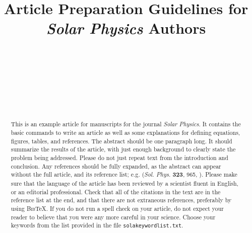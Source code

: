 \documentclass[namedreferences,hyperref,optionalrh]{spr-sola}
\newcommand{\BibTeX}{\textsc{Bib}\TeX}
\newcommand{\solphys}{{\it Sol. Phys.}}
\begin{document}
\begin{frontmatter}
\title{Article Preparation Guidelines for {\it Solar Physics} Authors}

\author[addressref={aff1,aff2,aff3},email={e-mail.a@mail.com}]{~}
\author[addressref=aff1,email={e-mail.b@mail.com}]{~}
\author[addressref=aff2,corref,email={e-mail.c@mail.com}]{~}
\author[addressref=aff3]{~}
\address[id=aff1]{First very very very very very very very very very
 very very very very very very very very very very very very very very very very very very long affiliation and address}
\address[id=aff2]{Institution, City, State, Country}
\address[id=aff3]{Third affiliation and address}


\begin{abstract}
This is an example article for manuscripts for the journal {\it Solar 
Physics}. It contains the basic commands to write an article as well 
as some explanations for defining equations, figures, tables,
and references.    
The abstract should be one paragraph long.  It should summarize
the results of the article, with just enough background to clearly state the
problem being addressed.
Please do not just repeat text from the introduction and conclusion.
Any references should be fully expanded, as the abstract can appear 
without the full article, and its reference list; 
e.g. \citeauthor{Dupont07} (\solphys{} \textbf{323}, 965, 
\citeyear{Dupont07}).
Please make sure that the language of the article has been reviewed by a
scientist fluent in English, or an editorial professional.
Check that all of the citations in the text are in the reference list at the
end, and that there are not extraneous references, preferably by using 
\BibTeX . If you do not run a spell check on your article, do not expect 
your reader to believe that you were any more careful in your science. 
Choose your keywords from the list provided in the file 
\texttt{sola\us keyword\us list.txt}.  
\end{abstract}

\begin{keyword}
\end{keyword}

\end{frontmatter}
\end{document}
